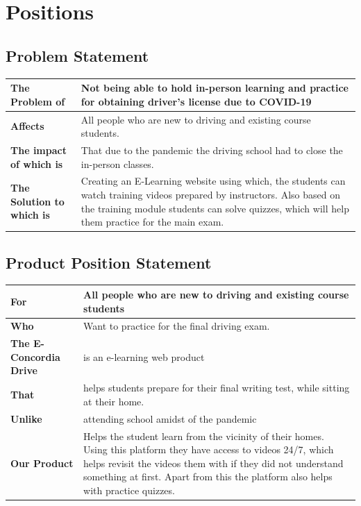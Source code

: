 \documentclass{article}
\begin{document}
\section{Positions}

\subsection{Problem Statement}


\begin{tabular}{|p{4.5cm}|p{11.5cm}|}
\hline
\textbf{The Problem of} & Not being able to hold in-person learning and practice for obtaining driver's license due to COVID-19 \\ \hline
\textbf{Affects} & All people who are new to driving and existing course students. \\ \hline
\textbf{The impact of which is} & That due to the pandemic the driving school had to close the in-person classes. \\ \hline
\textbf{The Solution to which is} & Creating an E-Learning website using which, the students can watch training videos prepared by instructors. Also based on the training module students can solve quizzes, which will help them practice for the main exam.\\ \hline
\end{tabular}


\subsection{Product Position Statement}


\begin{tabular}{|p{4.5cm}|p{11.5cm}|}
\hline
\textbf{For} & All people who are new to driving and existing course students\\ \hline
\textbf{Who}& Want to practice for the final driving exam.\\ \hline
\textbf{The E-Concordia Drive} & is an e-learning web product\\ \hline
\textbf{That} & helps students prepare for their final writing test, while sitting at their home.\\ \hline
\textbf{Unlike} & attending school amidst of the pandemic \\ \hline
\textbf{Our Product} & Helps the student learn from the vicinity of their homes. Using this platform they have access to videos 24/7, which helps revisit the videos them with if they did not understand something at first. Apart from this the platform also helps with practice quizzes.\\ \hline
\end{tabular}
\end{document}
